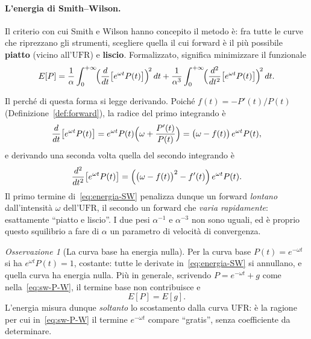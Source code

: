 \documentclass[11pt,a4paper]{article}
\theoremstyle{plain}
\theoremstyle{definition}
\theoremstyle{remark}
\newtheorem*{osservazione}{Osservazione}
\newcommand{\UFR}{\ensuremath{\mathrm{UFR}}}
\begin{document}
\paragraph{L'energia di Smith--Wilson.}
Il criterio con cui Smith e Wilson hanno concepito il metodo \`e: fra tutte le curve che
riprezzano gli strumenti, scegliere quella il cui forward \`e il pi\`u possibile
\textbf{piatto} (vicino all'$\UFR$) e \textbf{liscio}. Formalizzato, significa minimizzare il
funzionale
\begin{equation}
  E[P] = \frac{1}{\alpha}\int_0^{+\infty}\!\Bigl(\frac{d}{dt}\bigl[e^{\omega t}P(t)\bigr]\Bigr)^{\!2}\,dt
       + \frac{1}{\alpha^{3}}\int_0^{+\infty}\!\Bigl(\frac{d^2}{dt^2}\bigl[e^{\omega t}P(t)\bigr]\Bigr)^{\!2}\,dt .
  \label{eq:energia-SW}
\end{equation}

Il perch\'e di questa forma si legge derivando. Poich\'e $f(t) = -P'(t)/P(t)$
(Definizione~\ref{def:forward}), la radice del primo integrando \`e
\[
  \frac{d}{dt}\bigl[e^{\omega t}P(t)\bigr]
  = e^{\omega t}P(t)\Bigl(\omega + \frac{P'(t)}{P(t)}\Bigr)
  = \bigl(\omega - f(t)\bigr)\,e^{\omega t}P(t),
\]
e derivando una seconda volta quella del secondo integrando \`e
\[
  \frac{d^2}{dt^2}\bigl[e^{\omega t}P(t)\bigr]
  = \Bigl(\bigl(\omega - f(t)\bigr)^{2} - f'(t)\Bigr)\,e^{\omega t}P(t).
\]
Il primo termine di~\eqref{eq:energia-SW} penalizza dunque un forward \emph{lontano}
dall'intensit\`a $\omega$ dell'$\UFR$, il secondo un forward che \emph{varia rapidamente}:
esattamente ``piatto e liscio''. I due pesi $\alpha^{-1}$ e $\alpha^{-3}$ non sono uguali, ed
\`e proprio questo squilibrio a fare di $\alpha$ un parametro di velocit\`a di convergenza.

\begin{osservazione}[La curva base ha energia nulla]
Per la curva base $P(t) = e^{-\omega t}$ si ha $e^{\omega t}P(t) = 1$, costante: tutte le
derivate in~\eqref{eq:energia-SW} si annullano, e quella curva ha energia nulla. Pi\`u in
generale, scrivendo $P = e^{-\omega t} + g$ come nella~\eqref{eq:sw-P-W}, il termine base non
contribuisce e
\[
  E[P] = E[g] .
\]
L'energia misura dunque \emph{soltanto} lo scostamento dalla curva $\UFR$: \`e la ragione per
cui in~\eqref{eq:sw-P-W} il termine $e^{-\omega t}$ compare ``gratis'', senza coefficiente da
determinare.
\end{osservazione}

\end{document}

